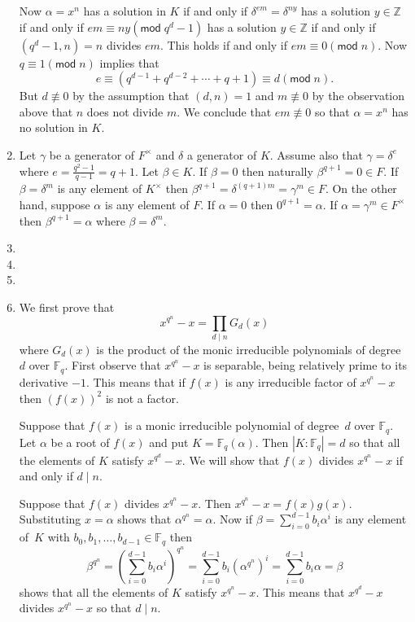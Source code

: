 \documentclass[12pt]{article}
\renewcommand{\pmod}[1]{\left(\mathsf{mod}\;#1\right)}
\begin{document}
\begin{enumerate}
Now $\alpha=x^n$ has a solution in $K$ if and only if
$\delta^{em}=\delta^{ny}$ has a solution $y\in\mathbb{Z}$
if and only if $em\equiv ny\pmod{q^d-1}$
has a solution $y\in\mathbb{Z}$
if and only if $\left(q^d-1,n\right)=n$ divides $em$.
This holds if and only if $em\equiv 0\pmod{n}$.
Now $q\equiv 1\pmod{n}$ implies that
\[e\equiv\left(q^{d-1}+q^{d-2}+\cdots+q+1\right)\equiv d\pmod{n}.\]
But $d\not\equiv 0$ by the assumption
that $\left(d,n\right)=1$ and $m\not\equiv 0$ by the observation
above that $n$ does not divide $m$.
We conclude that $em\not\equiv 0$ so that $\alpha=x^n$
has no solution in $K$.

\item %
Let $\gamma$ be a generator of $F^\times$
and $\delta$ a generator of $K$.
Assume also that $\gamma=\delta^e$
where $e=\frac{q^2-1}{q-1}=q+1$.
Let $\beta\in K$.
If $\beta=0$ then naturally $\beta^{q+1}=0\in F$.
If $\beta=\delta^m$ is any element of $K^\times$
then $\beta^{q+1}=\delta^{\left(q+1\right)m}=\gamma^m\in F$.
On the other hand, suppose $\alpha$ is any element of $F$.
If $\alpha=0$ then $0^{q+1}=\alpha$.
If $\alpha=\gamma^m\in F^\times$
then $\beta^{q+1}=\alpha$ where $\beta=\delta^m$.

\item %
\item %
\item %
\item %
We first prove that
\begin{equation}\label{Theorem2}
x^{q^n}-x=\prod_{d\mid n}G_d\left(x\right)
\end{equation}
where $G_d\left(x\right)$ is the product
of the monic irreducible polynomials of degree~$d$ over $\mathbb{F}_q$.
First observe that $x^{q^n}-x$ is separable, being
relatively prime to its derivative $-1$. This means that if
$f\left(x\right)$ is any irreducible factor of $x^{q^n}-x$
then $\left(f\left(x\right)\right)^2$ is not a factor.

Suppose that $f\left(x\right)$ is a monic irreducible polynomial
of degree~$d$ over $\mathbb{F}_q$.
Let $\alpha$ be a root of $f\left(x\right)$ and put
$K=\mathbb{F}_q\left(\alpha\right)$. Then $\left|K:\mathbb{F}_q\right|=d$
so that all the elements of $K$ satisfy $x^{q^d}-x$.
We will show that $f\left(x\right)$ divides $x^{q^n}-x$
if and only if $d\mid n$.

Suppose that $f\left(x\right)$ divides $x^{q^n}-x$.
Then $x^{q^n}-x=f\left(x\right)g\left(x\right)$.
Substituting $x=\alpha$ shows that $\alpha^{q^n}=\alpha$.
Now if $\beta=\sum_{i=0}^{d-1}b_i\alpha^i$ is any element
of~$K$ with $b_0,b_1,\ldots,b_{d-1}\in\mathbb{F}_q$ then
\[\beta^{q^n}=\left(\sum_{i=0}^{d-1}b_i\alpha^i\right)^{q^n}
=\sum_{i=0}^{d-1}b_i\left(\alpha^{q^n}\right)^i
=\sum_{i=0}^{d-1}b_i\alpha=\beta\]
shows that all the elements of $K$ satisfy $x^{q^n}-x$.
This means that $x^{q^d}-x$ divides $x^{q^n}-x$ so that $d\mid n$.


\end{enumerate}
\end{document}
